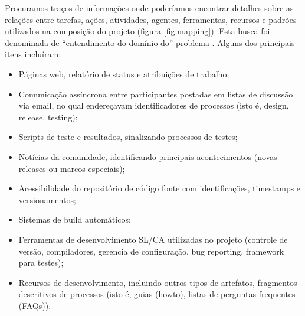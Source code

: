 Procuramos traços de informações onde poderíamos encontrar detalhes sobre as relações entre tarefas, ações, atividades, agentes, ferramentas, recursos e padrões utilizados na composição do projeto (figura \ref{fig:mapping}). Esta busca foi denominada de ``entendimento do domínio do'' problema \cite{experience}. Alguns dos principais itens incluíram:


\begin{itemize}
 \item Páginas web, relatório de status e atribuições de trabalho;
 \item Comunicação assíncrona entre participantes postadas em listas de discussão via email, no qual endereçavam identificadores de processos (isto é, design, release, testing);
 \item Scripts de teste e resultados, sinalizando processos de testes;
 \item Notícias da comunidade, identificando principais acontecimentos (novas releases ou marcos especiais);
 \item Acessibilidade do repositório de código fonte com identificações, timestamps e versionamentos;
 \item Sistemas de build automáticos;
 \item Ferramentas de desenvolvimento SL/CA utilizadas no projeto (controle de versão, compiladores, gerencia de configuração, bug reporting, framework para testes);
 \item Recursos de desenvolvimento, incluindo outros tipos de artefatos, fragmentos descritivos de processos (isto é, guias (howto), listas de perguntas frequentes (FAQs)).
\end{itemize}

